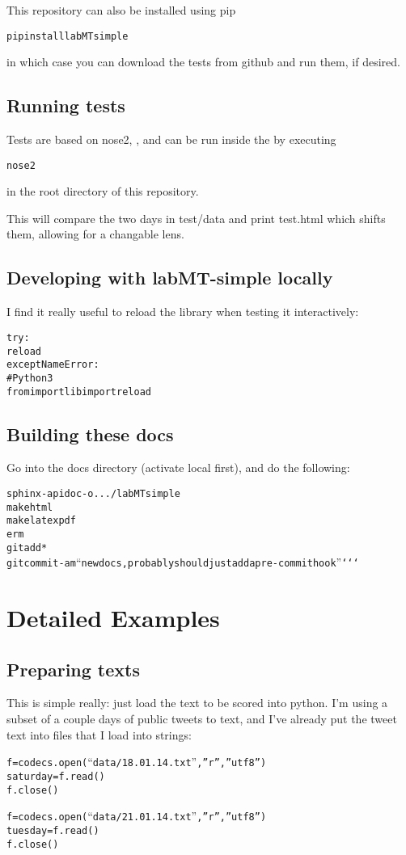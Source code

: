\documentclass[letterpaper,10pt,english]{sphinxmanual}
\begin{document}
This repository can also be installed using pip
\begin{alltt}
pip install labMTsimple
\end{alltt}

in which case you can download the tests from github and run them, if desired.


\section{Running tests}
\label{getting-started:running-tests}
Tests are based on nose2, , and can be run inside the by executing
\begin{alltt}
nose2
\end{alltt}

in the root directory of this repository.

This will compare the two days in test/data and print test.html which shifts them, allowing for a changable lens.


\section{Developing with labMT-simple locally}
\label{getting-started:developing-with-labmt-simple-locally}
I find it really useful to reload the library when testing it interactively:
\begin{alltt}
try:
    reload
except NameError:
    \# Python 3
    from importlib import reload
\end{alltt}


\section{Building these docs}
\label{getting-started:building-these-docs}
Go into the docs directory (activate local  first), and do the following:
\begin{alltt}
sphinx-apidoc -o . ../labMTsimple
make html
make latexpdf
erm
git add *
git commit -am ``new docs, probably should just add a pre-commit hook''{}`{}`{}`
\end{alltt}


\chapter{Detailed Examples}
\label{detailed-example::doc}\label{detailed-example:detailed-examples}

\section{Preparing texts}
\label{detailed-example:preparing-texts}
This is simple really: just load the text to be scored into python.
I'm using a subset of a couple days of public tweets to text, and I've already put the tweet text into  files that I load into strings:
\begin{alltt}
f = codecs.open(``data/18.01.14.txt'',''r'',''utf8'')
saturday = f.read()
f.close()

f = codecs.open(``data/21.01.14.txt'',''r'',''utf8'')
tuesday = f.read()
f.close()
\end{alltt}
\end{document}
